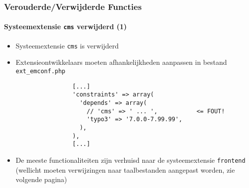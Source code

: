 \begin{frame}[fragile]
	\frametitle{Verouderde/Verwijderde Functies}
	\framesubtitle{Systeemextensie \texttt{cms} verwijderd (1)}

	\lstset{basicstyle=\tiny\ttfamily}

	\begin{itemize}

		\item Systeemextensie \texttt{cms} is verwijderd

		\item Extensieontwikkelaars moeten afhankelijkheden aanpassen in bestand \texttt{ext\_emconf.php}

			\begin{lstlisting}
				[...]
				'constraints' => array(
				  'depends' => array(
				    // 'cms' => ' ... ',           <= FOUT!
				    'typo3' => '7.0.0-7.99.99',
				  ),
				),
				[...]
			\end{lstlisting}

		\item De meeste functionaliteiten zijn verhuisd naar de systeemextensie \texttt{frontend}
			(wellicht moeten verwijzingen naar taalbestanden aangepast worden, zie volgende pagina)

	\end{itemize}

\end{frame}


